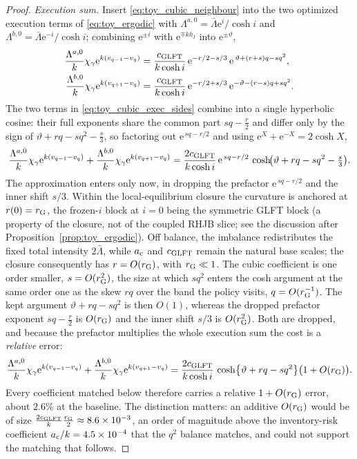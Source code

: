 \documentclass[11pt,a4paper]{article}
\newcommand{\e}{\mathrm e}
\theoremstyle{plain}
\theoremstyle{definition}
\begin{document}
\begin{proof}
\emph{Execution sum.}  Insert \eqref{eq:toy_cubic_neighbour} into the two
optimized execution terms of \eqref{eq:toy_ergodic} with
\(\Lambda^{a,0}=\bar\Lambda\e^{i}/\cosh i\) and
\(\Lambda^{b,0}=\bar\Lambda\e^{-i}/\cosh i\); combining \(\e^{\pm i}\) with
\(\e^{\mp kh_I}\) into \(\e^{\pm\vartheta}\),
\begin{align}
\frac{\Lambda^{a,0}}{k}\chi_\gamma\e^{k(v_{q-1}-v_q)}
&=\frac{c_{\rm GLFT}}{k\cosh i}\,\e^{-r/2-s/3}\,
\e^{\,\vartheta+(r+s)q-s q^2},
\notag\\
\frac{\Lambda^{b,0}}{k}\chi_\gamma\e^{k(v_{q+1}-v_q)}
&=\frac{c_{\rm GLFT}}{k\cosh i}\,\e^{-r/2+s/3}\,
\e^{-\vartheta-(r-s)q+s q^2}.
\label{eq:toy_cubic_exec_sides}
\end{align}
The two terms in \eqref{eq:toy_cubic_exec_sides} combine into a single
hyperbolic cosine: their full exponents
share the common part \(sq-\tfrac r2\) and differ only by
the sign of \(\vartheta+rq-sq^2-\tfrac s3\), so factoring out \(\e^{\,sq-r/2}\)
and using \(\e^{X}+\e^{-X}=2\cosh X\),
\[
\frac{\Lambda^{a,0}}{k}\chi_\gamma\e^{k(v_{q-1}-v_q)}
+\frac{\Lambda^{b,0}}{k}\chi_\gamma\e^{k(v_{q+1}-v_q)}
=\frac{2c_{\rm GLFT}}{k\cosh i}\,\e^{\,sq-r/2}\,
\cosh\!\bigl(\vartheta+rq-sq^2-\tfrac s3\bigr).
\]
The approximation enters only now, in dropping the prefactor
\(\e^{\,sq-r/2}\) and the inner shift \(s/3\).  Within the local-equilibrium
closure the curvature is anchored at \(r(0)=r_{\rm G}\), the frozen-\(i\) block
at \(i=0\) being the symmetric GLFT block (a property of the closure, not of
the coupled RHJB slice; see the discussion after
Proposition~\ref{prop:toy_ergodic}).  Off balance, the imbalance redistributes the fixed total intensity
\(2\bar\Lambda\), while \(a_{\rm c}\) and \(c_{\rm GLFT}\) remain the natural
base scales; the closure consequently has \(r=O(r_{\rm G})\), with
\(r_{\rm G}\ll1\).  The cubic coefficient is one order smaller,
\(s=O(r_{\rm G}^2)\), the size at which \(sq^2\) enters the cosh argument at the
same order one as the skew \(rq\) over the band the policy visits,
\(q=O(r_{\rm G}^{-1})\).  The kept argument \(\vartheta+rq-sq^2\) is then
\(O(1)\), whereas the dropped prefactor exponent \(sq-\tfrac r2\) is
\(O(r_{\rm G})\) and the inner shift \(s/3\) is \(O(r_{\rm G}^2)\).  Both
are dropped, and because the prefactor multiplies the whole execution sum the
cost is a \emph{relative} error:
\begin{equation}
\frac{\Lambda^{a,0}}{k}\chi_\gamma\e^{k(v_{q-1}-v_q)}
+\frac{\Lambda^{b,0}}{k}\chi_\gamma\e^{k(v_{q+1}-v_q)}
=\frac{2c_{\rm GLFT}}{k\cosh i}\,
\cosh\bigl\{\vartheta+rq-s q^2\bigr\}\bigl(1+O(r_{\rm G})\bigr).
\label{eq:toy_cubic_cosh}
\end{equation}
Every coefficient matched below therefore carries a relative
\(1+O(r_{\rm G})\) error, about \(2.6\%\) at the baseline.  The distinction
matters: an additive \(O(r_{\rm G})\) would be of size
\(\tfrac{2c_{\rm GLFT}}{k}\tfrac{r_{\rm G}}{2}\approx8.6\times10^{-3}\),
an order of magnitude above the inventory-risk coefficient
\(a_{\rm c}/k=4.5\times10^{-4}\) that the \(q^2\) balance matches, and could
not support the matching that follows.


\end{proof}
\end{document}
